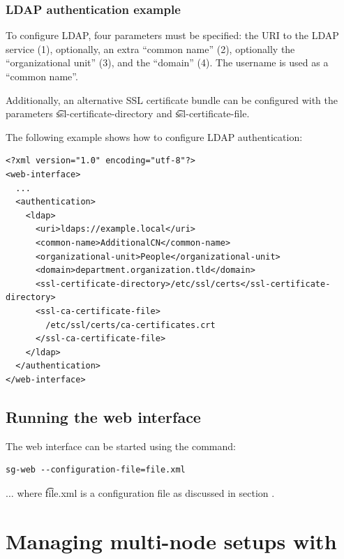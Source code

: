 \subsubsection{LDAP authentication example}

  To configure LDAP, four parameters must be specified: the URI to the LDAP
  service (1), optionally, an extra ``common name'' (2), optionally the
  ``organizational unit'' (3), and the ``domain'' (4).  The username is used
  as a ``common name''.

  \begin{sloppypar}
  Additionally, an alternative SSL certificate bundle can be configured with
  the parameters \t{ssl-certificate-directory} and
  \t{ssl-certificate-file}.
  \end{sloppypar}

  The following example shows how to configure LDAP authentication:

\begin{siderules}
\begin{verbatim}
<?xml version="1.0" encoding="utf-8"?>
<web-interface>
  ...
  <authentication>
    <ldap>
      <uri>ldaps://example.local</uri>
      <common-name>AdditionalCN</common-name>
      <organizational-unit>People</organizational-unit>
      <domain>department.organization.tld</domain>
      <ssl-certificate-directory>/etc/ssl/certs</ssl-certificate-directory>
      <ssl-ca-certificate-file>
        /etc/ssl/certs/ca-certificates.crt
      </ssl-ca-certificate-file>
    </ldap>
  </authentication>
</web-interface>
\end{verbatim}
\end{siderules}

\subsection{Running the web interface}

  The web interface can be started using the  command:

\begin{siderules}
\begin{verbatim}
sg-web --configuration-file=file.xml
\end{verbatim}
\end{siderules}

  $\ldots{}$ where \t{file.xml} is a configuration file as
  discussed in section .

\section{Managing multi-node setups with }

